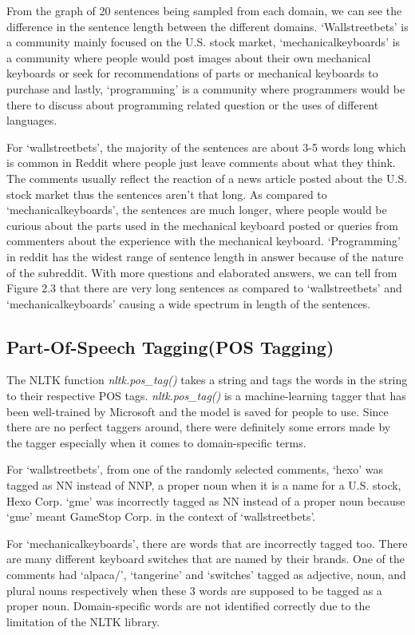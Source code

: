 \documentclass[sigconf,nonacm=true]{acmart}
\begin{document}
From the graph of 20 sentences being sampled from each domain, we can see the difference in the sentence length between the different domains. ‘Wallstreetbets’ is a community mainly focused on the U.S. stock market, ‘mechanicalkeyboards’ is a community where people would post images about their own mechanical keyboards or seek for recommendations of parts or mechanical keyboards to purchase and lastly, ‘programming’ is a community where programmers would be there to discuss about programming related question or the uses of different languages. \smallskip

For ‘wallstreetbets’, the majority of the sentences are about 3-5 words long which is common in Reddit where people just leave comments about what they think. The comments usually reflect the reaction of a news article posted about the U.S. stock market thus the sentences aren’t that long. As compared to ‘mechanicalkeyboards’, the sentences are much longer, where people would be curious about the parts used in the mechanical keyboard posted or queries from commenters about the experience with the mechanical keyboard. ‘Programming’ in reddit has the widest range of sentence length in answer because of the nature of the subreddit. With more questions and elaborated answers, we can tell from Figure 2.3 that there are very long sentences as compared to ‘wallstreetbets’ and ‘mechanicalkeyboards’ causing a wide spectrum in length of the sentences.
\subsection{Part-Of-Speech Tagging(POS Tagging)}
The NLTK function \textit{nltk.pos\_tag()} takes a string and tags the words in the string to their respective POS tags. \textit{nltk.pos\_tag()} is a machine-learning tagger that has been well-trained by Microsoft and the model is saved for people to use. Since there are no perfect taggers around, there were definitely some errors made by the tagger especially when it comes to domain-specific terms.

For ‘wallstreetbets’, from one of the randomly selected comments, ‘hexo’ was tagged as NN instead of NNP, a proper noun when it is a name for a U.S. stock, Hexo Corp. ‘gme’ was incorrectly tagged as NN instead of a proper noun because ‘gme’ meant GameStop Corp. in the context of ‘wallstreetbets’.

For ‘mechanicalkeyboards’, there are words that are incorrectly tagged too. There are many different keyboard switches that are named by their brands. One of the comments had ‘alpaca/’, ‘tangerine’ and ‘switches’ tagged as adjective, noun, and plural nouns respectively when these 3 words are supposed to be tagged as a proper noun. Domain-specific words are not identified correctly due to the limitation of the NLTK library.
\end{document}
